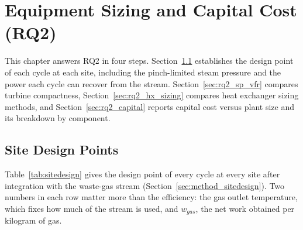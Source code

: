 \documentclass[12pt,a4paper]{report}
\begin{document}
\chapter{Equipment Sizing and Capital Cost (RQ2)}
\label{ch:results_rq2}

This chapter answers RQ2 in four steps. Section~\ref{sec:rq2_sitedesign}
establishes the design point of each cycle at each site, including the
pinch-limited steam pressure and the power each cycle can recover from the
stream. Section~\ref{sec:rq2_sp_vfr} compares turbine compactness,
Section~\ref{sec:rq2_hx_sizing} compares heat exchanger sizing methods, and
Section~\ref{sec:rq2_capital} reports capital cost versus plant size and its
breakdown by component.

\section{Site Design Points}
\label{sec:rq2_sitedesign}

Table~\ref{tab:sitedesign} gives the design point of every cycle at every
site after integration with the waste-gas stream
(Section~\ref{sec:method_sitedesign}). Two numbers in each row matter more
than the efficiency: the gas outlet temperature, which fixes how much of the
stream is used, and $w_{gas}$, the net work obtained per kilogram of gas.
\end{document}
